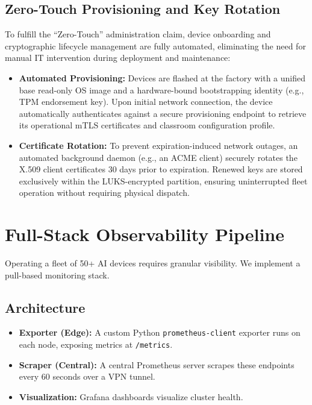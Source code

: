 \documentclass[conference]{IEEEtran}
\begin{document}
\subsection{Zero-Touch Provisioning and Key Rotation}
To fulfill the ``Zero-Touch'' administration claim, device onboarding and cryptographic lifecycle management are fully automated, eliminating the need for manual IT intervention during deployment and maintenance:
\begin{itemize}
    \item \textbf{Automated Provisioning:} Devices are flashed at the factory with a unified base read-only OS image and a hardware-bound bootstrapping identity (e.g., TPM endorsement key). Upon initial network connection, the device automatically authenticates against a secure provisioning endpoint to retrieve its operational mTLS certificates and classroom configuration profile.
    \item \textbf{Certificate Rotation:} To prevent expiration-induced network outages, an automated background daemon (e.g., an ACME client) securely rotates the X.509 client certificates 30 days prior to expiration. Renewed keys are stored exclusively within the LUKS-encrypted partition, ensuring uninterrupted fleet operation without requiring physical dispatch.
\end{itemize}

\section{Full-Stack Observability Pipeline}
Operating a fleet of 50+ AI devices requires granular visibility. We implement a pull-based monitoring stack.

\subsection{Architecture}
\begin{itemize}
    \item \textbf{Exporter (Edge):} A custom Python \texttt{prometheus-client} exporter runs on each node, exposing metrics at \texttt{/metrics}.
    \item \textbf{Scraper (Central):} A central Prometheus server scrapes these endpoints every 60 seconds over a VPN tunnel.
    \item \textbf{Visualization:} Grafana dashboards visualize cluster health.
\end{itemize}
\end{document}
